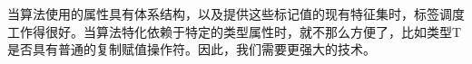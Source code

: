 当算法使用的属性具有体系结构，以及提供这些标记值的现有特征集时，标签调度工作得很好。当算法特化依赖于特定的类型属性时，就不那么方便了，比如类型T是否具有普通的复制赋值操作符。因此，我们需要更强大的技术。



































